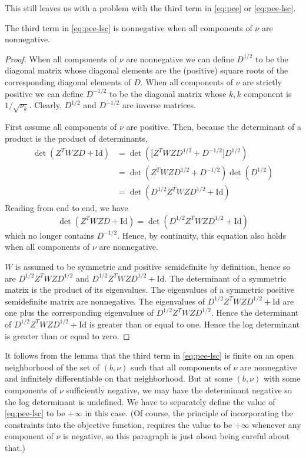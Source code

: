 This still leaves us with a problem with the third term in \eqref{eq:pee}
or \eqref{eq:pee-lsc}.
\begin{lemma}
The third term in \eqref{eq:pee-lsc} is nonnegative when all components of
$\nu$ are nonnegative.
\end{lemma}
\begin{proof}
When all components of $\nu$ are nonnegative we can define $D^{1/2}$ to be
the diagonal matrix whose diagonal elements are the (positive) square roots
of the corresponding diagonal elements of $D$.
When all components of $\nu$ are strictly positive we can define $D^{-1/2}$
to be the diagonal matrix whose $k, k$ component is $1 / \sqrt{\nu_k}$.
Clearly, $D^{1/2}$ and $D^{-1/2}$ are inverse matrices.

First assume all components of $\nu$ are positive.
Then, because the determinant
of a product is the product of determinants,
\begin{align*}
   \det \left( Z^T W Z D + \text{Id} \right)
   & =
   \det \left( \bigl[ Z^T W Z D^{1/2} + D^{-1/2} \bigr] D^{1/2} \right)
   \\
   & =
   \det \left( Z^T W Z D^{1/2} + D^{-1/2} \right) \det \left( D^{1/2} \right)
   \\
   & =
   \det \left( D^{1/2} Z^T W Z D^{1/2} + \text{Id} \right)
\end{align*}
Reading from end to end, we have
\begin{equation*}
   \det \left( Z^T W Z D + \text{Id} \right)
   =
   \det \left( D^{1/2} Z^T W Z D^{1/2} + \text{Id} \right)
\end{equation*}
which no longer contains $D^{-1/2}$.  Hence, by continuity, this equation
also holds when all components of $\nu$ are nonnegative.

$W$ is assumed to be symmetric and positive semidefinite by definition,
hence so are $D^{1/2} Z^T W Z D^{1/2}$
and $D^{1/2} Z^T W Z D^{1/2} + \text{Id}$.
The determinant of a symmetric matrix is the product of its eigenvalues.
The eigenvalues of a symmetric positive semidefinite matrix are nonnegative.
The eigenvalues of $D^{1/2} Z^T W Z D^{1/2} + \text{Id}$ are one plus the
corresponding eigenvalues of $D^{1/2} Z^T W Z D^{1/2}$.  Hence the determinant
of $D^{1/2} Z^T W Z D^{1/2} + \text{Id}$ is greater than or equal to one.
Hence the log determinant is greater than or equal to zero.
\end{proof}

It follows from the lemma that the third term in \eqref{eq:pee-lsc} is
finite on an open neighborhood of the set of $(b, \nu)$ such that all
components of $\nu$ are nonnegative and infinitely differentiable on
that neighborhood.  But at some $(b, \nu)$ with some components of $\nu$
sufficiently negative, we may have the determinant negative so the log
determinant is undefined.  We have to separately define the value of
\eqref{eq:pee-lsc} to be $+\infty$ in this case.
(Of course, the principle of incorporating the constraints into the
objective function, requires the value to be $+\infty$ whenever any
component of $\nu$ is negative, so this paragraph is just about being
careful about that.)

